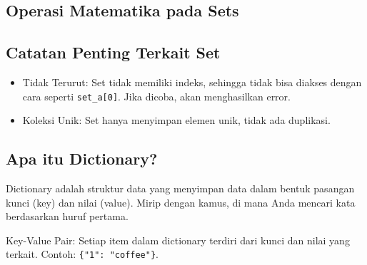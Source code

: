 \documentclass{article}
\begin{document}
\subsection{Operasi Matematika pada Sets}

\subsection{Catatan Penting Terkait Set}
\begin{itemize}
    \item Tidak Terurut: Set tidak memiliki indeks, sehingga tidak bisa diakses dengan cara seperti \verb|set_a[0]|. Jika dicoba, akan menghasilkan error.
    \item Koleksi Unik: Set hanya menyimpan elemen unik, tidak ada duplikasi.
\end{itemize}

\subsection{Apa itu Dictionary?}
Dictionary adalah struktur data yang menyimpan data dalam bentuk pasangan kunci (key) dan nilai (value). Mirip dengan kamus, di mana Anda mencari kata berdasarkan huruf pertama.

Key-Value Pair: Setiap item dalam dictionary terdiri dari kunci dan nilai yang terkait. Contoh: \verb|{"1": "coffee"}|.
\end{document}
